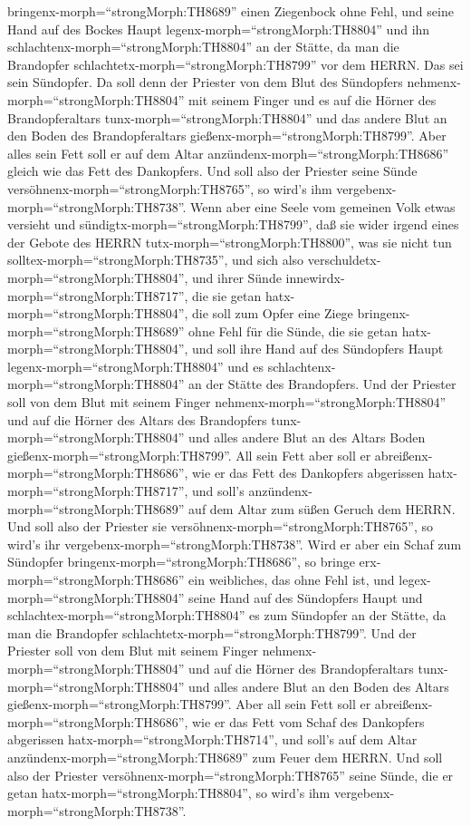 bringenx-morph=``strongMorph:TH8689'' einen Ziegenbock ohne Fehl,
 und seine Hand auf des Bockes Haupt
legenx-morph=``strongMorph:TH8804'' und ihn
schlachtenx-morph=``strongMorph:TH8804'' an der Stätte, da man die
Brandopfer schlachtetx-morph=``strongMorph:TH8799'' vor dem HERRN. Das
sei sein Sündopfer.  Da soll denn der Priester von dem Blut
des Sündopfers nehmenx-morph=``strongMorph:TH8804'' mit seinem Finger
und es auf die Hörner des Brandopferaltars
tunx-morph=``strongMorph:TH8804'' und das andere Blut an den Boden des
Brandopferaltars gießenx-morph=``strongMorph:TH8799''. 
Aber alles sein Fett soll er auf dem Altar
anzündenx-morph=``strongMorph:TH8686'' gleich wie das Fett des
Dankopfers. Und soll also der Priester seine Sünde
versöhnenx-morph=``strongMorph:TH8765'', so wird's ihm
vergebenx-morph=``strongMorph:TH8738''.  Wenn aber eine
Seele vom gemeinen Volk etwas versieht und
sündigtx-morph=``strongMorph:TH8799'', daß sie wider irgend eines der
Gebote des HERRN tutx-morph=``strongMorph:TH8800'', was sie nicht tun
solltex-morph=``strongMorph:TH8735'', und sich also
verschuldetx-morph=``strongMorph:TH8804'',  und ihrer Sünde
innewirdx-morph=``strongMorph:TH8717'', die sie getan
hatx-morph=``strongMorph:TH8804'', die soll zum Opfer eine Ziege
bringenx-morph=``strongMorph:TH8689'' ohne Fehl für die Sünde, die sie
getan hatx-morph=``strongMorph:TH8804'',  und soll ihre
Hand auf des Sündopfers Haupt legenx-morph=``strongMorph:TH8804'' und es
schlachtenx-morph=``strongMorph:TH8804'' an der Stätte des Brandopfers.
 Und der Priester soll von dem Blut mit seinem Finger
nehmenx-morph=``strongMorph:TH8804'' und auf die Hörner des Altars des
Brandopfers tunx-morph=``strongMorph:TH8804'' und alles andere Blut an
des Altars Boden gießenx-morph=``strongMorph:TH8799''.  All
sein Fett aber soll er abreißenx-morph=``strongMorph:TH8686'', wie er
das Fett des Dankopfers abgerissen hatx-morph=``strongMorph:TH8717'',
und soll's anzündenx-morph=``strongMorph:TH8689'' auf dem Altar zum
süßen Geruch dem HERRN. Und soll also der Priester sie
versöhnenx-morph=``strongMorph:TH8765'', so wird's ihr
vergebenx-morph=``strongMorph:TH8738''.  Wird er aber ein
Schaf zum Sündopfer bringenx-morph=``strongMorph:TH8686'', so bringe
erx-morph=``strongMorph:TH8686'' ein weibliches, das ohne Fehl ist,
 und legex-morph=``strongMorph:TH8804'' seine Hand auf des
Sündopfers Haupt und schlachtex-morph=``strongMorph:TH8804'' es zum
Sündopfer an der Stätte, da man die Brandopfer
schlachtetx-morph=``strongMorph:TH8799''.  Und der Priester
soll von dem Blut mit seinem Finger nehmenx-morph=``strongMorph:TH8804''
und auf die Hörner des Brandopferaltars
tunx-morph=``strongMorph:TH8804'' und alles andere Blut an den Boden des
Altars gießenx-morph=``strongMorph:TH8799''.  Aber all sein
Fett soll er abreißenx-morph=``strongMorph:TH8686'', wie er das Fett vom
Schaf des Dankopfers abgerissen hatx-morph=``strongMorph:TH8714'', und
soll's auf dem Altar anzündenx-morph=``strongMorph:TH8689'' zum Feuer
dem HERRN. Und soll also der Priester
versöhnenx-morph=``strongMorph:TH8765'' seine Sünde, die er getan
hatx-morph=``strongMorph:TH8804'', so wird's ihm
vergebenx-morph=``strongMorph:TH8738''.

